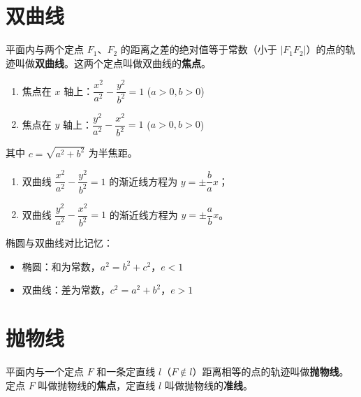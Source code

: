 \section{双曲线}

\begin{definition}[双曲线]
平面内与两个定点 $F_1$、$F_2$ 的距离之差的绝对值等于常数（小于 $|F_1F_2|$）的点的轨迹叫做\textbf{双曲线}。这两个定点叫做双曲线的\textbf{焦点}。
\end{definition}

\begin{theorem}[双曲线的标准方程]
\begin{enumerate}
    \item 焦点在 $x$ 轴上：$\dfrac{x^2}{a^2} - \dfrac{y^2}{b^2} = 1$ \quad ($a > 0, b > 0$)
    \item 焦点在 $y$ 轴上：$\dfrac{y^2}{a^2} - \dfrac{x^2}{b^2} = 1$ \quad ($a > 0, b > 0$)
\end{enumerate}
其中 $c = \sqrt{a^2 + b^2}$ 为半焦距。
\end{theorem}

\begin{theorem}[双曲线的渐近线]
\begin{enumerate}
    \item 双曲线 $\dfrac{x^2}{a^2} - \dfrac{y^2}{b^2} = 1$ 的渐近线方程为 $y = \pm\dfrac{b}{a}x$；
    \item 双曲线 $\dfrac{y^2}{a^2} - \dfrac{x^2}{b^2} = 1$ 的渐近线方程为 $y = \pm\dfrac{a}{b}x$。
\end{enumerate}
\end{theorem}

\begin{note}
椭圆与双曲线对比记忆：
\begin{itemize}
    \item 椭圆：和为常数，$a^2 = b^2 + c^2$，$e < 1$
    \item 双曲线：差为常数，$c^2 = a^2 + b^2$，$e > 1$
\end{itemize}
\end{note}

\section{抛物线}

\begin{definition}[抛物线]
平面内与一个定点 $F$ 和一条定直线 $l$（$F \notin l$）距离相等的点的轨迹叫做\textbf{抛物线}。定点 $F$ 叫做抛物线的\textbf{焦点}，定直线 $l$ 叫做抛物线的\textbf{准线}。
\end{definition}

